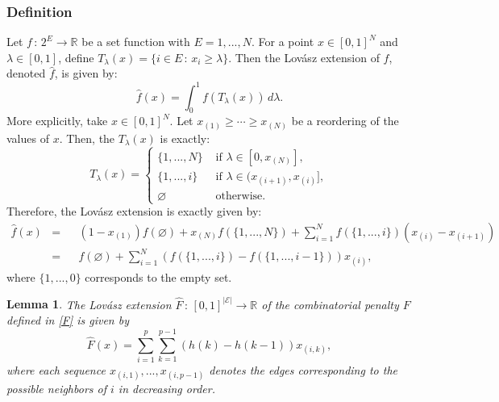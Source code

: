 \documentclass{uwstat572}
\newtheorem{lemma}[theorem]{Lemma}
\theoremstyle{remark}
\theoremstyle{definition}
\begin{document}
\subsubsection{Definition}
Let $f \, : \, 2^E \to \mathbb{R}$ be a set function with $E = {1,...,N}$.  For a point $x \in [0,1]^N$ and $\lambda \in [0,1]$, define $T_{\lambda}(x) = \{i \in E \, : \, x_i \geq \lambda\}$.  Then the Lov{\'a}sz extension of $f$, denoted $\hat{f}$, is given by:
\begin{equation*}
\hat{f}(x) = \int_{0}^1 f( T_{\lambda}(x)) \, d\lambda.
\end{equation*}
More explicitly, take $x \in [0,1]^N$.  Let $x_{(1)} \geq \cdots \geq x_{(N)}$ be a reordering of the values of $x$.  Then, the $T_{\lambda}(x)$ is exactly:
\begin{equation*}
T_{\lambda}(x) = \begin{cases}
\{1,...,N\} & {\text{ if }} \lambda \in [0,x_{(N)}],
\\
\{1,...,i\} & {\text{ if }} \lambda \in (x_{(i+1)}, x_{(i)}],
\\
\varnothing & {\text{ otherwise}}.
\end{cases}
\end{equation*}
Therefore, the Lov{\'a}sz extension is exactly given by:
\begin{equation}\label{lovasz}
\begin{aligned}
\hat{f}(x) &= &&(1-x_{(1)}) f( \varnothing) + x_{(N)} f(\{1,...,N\})+ \sum_{i=1}^N f(\{1,...,i\})(x_{(i)} - x_{(i+1)}) 
\\
&= && f(\varnothing) + \sum_{i=1}^N (f(\{1,...,i\}) - f(\{1,...,i-1\})) x_{(i)},
\end{aligned}
\end{equation}
where $\{1,...,0\}$ corresponds to the empty set.

\begin{lemma}\label{Fextension}
The Lov{\'a}sz extension $\hat{F} \, : \, [0,1]^{|\mathcal{E}|} \to \mathbb{R}$ of the combinatorial penalty $F$ defined in \eqref{F} is given by
\begin{equation}
\hat{F}(x) = \sum_{i=1}^p \sum_{k=1}^{p-1} (h(k) - h(k-1)) x_{(i,k)},
\end{equation}
where each sequence $x_{(i,1)},...,x_{(i,p-1)}$ denotes the edges corresponding to the possible neighbors of $i$ in decreasing order.
\end{lemma}
\end{document}
